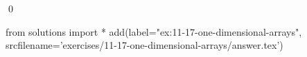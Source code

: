 
\begin{ex}
  \label{ex:11-17-one-dimensional-arrays}
  
  \qed
\end{ex}
\begin{python0}
from solutions import *
add(label="ex:11-17-one-dimensional-arrays",
    srcfilename='exercises/11-17-one-dimensional-arrays/answer.tex')
\end{python0}

